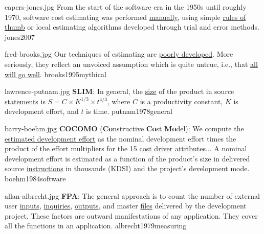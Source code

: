 \documentclass{article}
\begin{document}

\qte
  {capers-jones.jpg}
  {From the start of the software era in the 1950s until roughly 1970, software cost estimating was performed \ul{manually}, using simple \ul{rules of thumb} or local estimating algorithms developed through trial and error methods.}
  {jones2007}

\qte
  {fred-brooks.jpg}
  {Our techniques of estimating are \ul{poorly developed}. More seriously, they reflect an unvoiced assumption which is quite untrue, i.e., that \ul{all will go well}.}
  {brooks1995mythical}

\qte
  {lawrence-putnam.jpg}
  {\textbf{SLIM}: In general, the \ul{size} of the product in source \ul{statements} is \(S = C \times K^{1/3} \times t^{4/3}\), where \(C\) is a productivity constant, \(K\) is development effort, and \(t\) is time.}
  {putnam1978general}

\qte
  {barry-boehm.jpg}
  {\textbf{COCOMO} (\textbf{Co}nstructive \textbf{Co}st \textbf{Mo}del): We compute the \ul{estimated development effort} as the nominal development effort times the product of the effort multipliers for the 15 \ul{cost driver attributes}... A nominal development effort is estimated as a function of the product's size in delivered source \ul{instructions} in thousands (KDSI) and the project's development mode.}
  {boehm1984software}

\qte
  {allan-albrecht.jpg}
  {\textbf{FPA}: The general approach is to count the number of external user \ul{inputs}, \ul{inquiries}, \ul{outputs}, and master \ul{files} delivered by the development project. These factors are outward manifestations of any application. They cover all the functions in an application.}
  {albrecht1979measuring}

\end{document}
